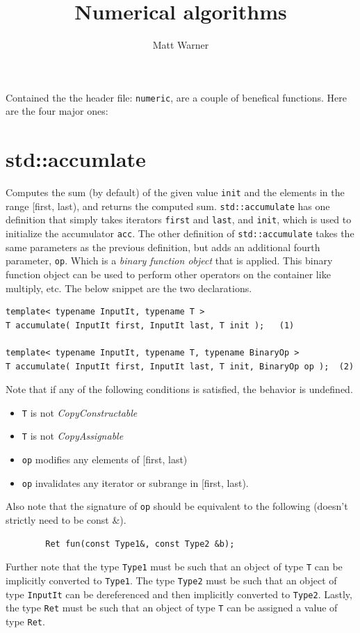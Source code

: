 \documentclass{report}
\title{\Huge{Numerical algorithms}}
\author{\huge{Matt Warner}}
\date{\huge{}}
\begin{document}
    \maketitle
\noindent Contained the the header file: \texttt{numeric}, are a couple of benefical functions. Here are the four major ones:
\section{std::accumlate}
Computes the sum (by default) of the given value \texttt{init} and the elements in the range [first, last), and returns the computed sum. \texttt{std::accumulate} has one definition that simply takes iterators \texttt{first} and \texttt{last}, and \texttt{init}, which is used to initialize the accumulator \texttt{acc}. The other definition of \texttt{std::accumulate} takes the same parameters as the previous definition, but adds an additional fourth parameter, \texttt{op}. Which is a \textit{binary function object} that is applied. This binary function object can be used to perform other operators on the container like multiply, etc.
\bigbreak \noindent
The below snippet are the two declarations.
\begin{verbatim}
template< typename InputIt, typename T >
T accumulate( InputIt first, InputIt last, T init );   (1)

template< typename InputIt, typename T, typename BinaryOp >
T accumulate( InputIt first, InputIt last, T init, BinaryOp op );  (2)
\end{verbatim}
Note that if any of the following conditions is satisfied, the behavior is undefined.
\begin{itemize}
    \item \texttt{T} is not \textit{CopyConstructable}
    \item \texttt{T} is not \textit{CopyAssignable}
    \item \texttt{op} modifies any elements of [first, last)
    \item \texttt{op} invalidates any iterator or subrange in [first, last).
\end{itemize}
        \bigbreak \noindent
        Also note that the signature of \texttt{op} should be equivalent to the following (doesn't strictly need to be const \&).
        \begin{verbatim}
        Ret fun(const Type1&, const Type2 &b);
        \end{verbatim}
        \noindent Further note that the type \texttt{Type1} must be such that an object of type \texttt{T} can be implicitly converted to \texttt{Type1}. The type \texttt{Type2} must be such that an object of type \texttt{InputIt} can be dereferenced and then implicitly converted to \texttt{Type2}. Lastly, the type \texttt{Ret} must be such that an object of type \texttt{T} can be assigned a value of type \texttt{Ret}.
\end{document}
